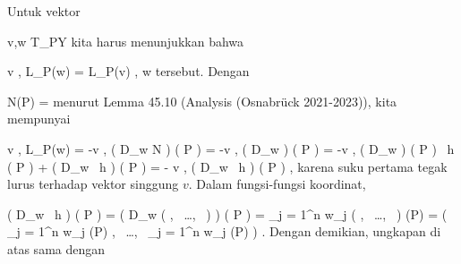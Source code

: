 {

Untuk vektor

\mavergleichskette
{\vergleichskette
{ v,w
}
{ \in }{ T_PY
}
{  }{
}
{    }{
}
{   }{
}
}
{}{}{}
kita harus menunjukkan bahwa

\mavergleichskettedisp
{\vergleichskette
{ \left\langle  v  ,  L_P(w)  \right\rangle
}
{ =} { \left\langle L_P(v) ,  w  \right\rangle
}
{ } {
}
{ } {
}
{ } {
}
}
{}{}{}
tersebut. Dengan

\mavergleichskette
{\vergleichskette
{ N(P)
}
{ = }{ {  }
}
{  }{
}
{    }{
}
{   }{
}
}
{}{}{}
menurut
Lemma 45.10 (Analysis (Osnabrück 2021-2023)), kita mempunyai

\mavergleichskettealignhandlinks
{\vergleichskettealignhandlinks
{ \left\langle  v  ,  L_P(w)  \right\rangle
}
{ =} { -\left\langle  v  ,  \left(  D_{w}  N   \right) \left(   P   \right)   \right\rangle
}
{ =} { -\left\langle  v  ,  \left(  D_{w}  {  }   \right) \left(   P   \right)     \right\rangle
}
{ =} { -\left\langle  v  ,  \left(  D_{w}  {  }   \right) \left(   P   \right) \cdot
{} \,  h  (  P ) + {  } \cdot  \left(  D_{w}
 \,  h   \right) \left(   P   \right)   \right\rangle
}
{ =} { - {  } \left\langle  v  ,  \left(  D_{w}
 \,  h   \right) \left(   P   \right)    \right\rangle
}
}
{}
{}{,}
karena suku pertama tegak lurus terhadap vektor singgung $v$. Dalam fungsi-fungsi koordinat,

\mavergleichskettealignhandlinks
{\vergleichskettealignhandlinks
{ \left(  D_{w}
 \,  h   \right) \left(   P   \right)
}
{ =} { \left(  D_{w}  \left(  {  }   , \,   \ldots  , \,   {  }                 \right)    \right) \left(   P   \right)
}
{ =} { \sum_{j = 1}^n  w_j  {  }  \left(  {  }   , \,   \ldots  , \,   {  }                 \right) (P)
}
{ =} { \left(  \sum_{j = 1}^n  w_j  {  }  {  } (P)   , \,   \ldots  , \,   \sum_{j = 1}^n  w_j  {  }  {  } (P)                 \right)
}
{ } {
}
}
{}
{}{.}
Dengan demikian, ungkapan di atas sama dengan

}
